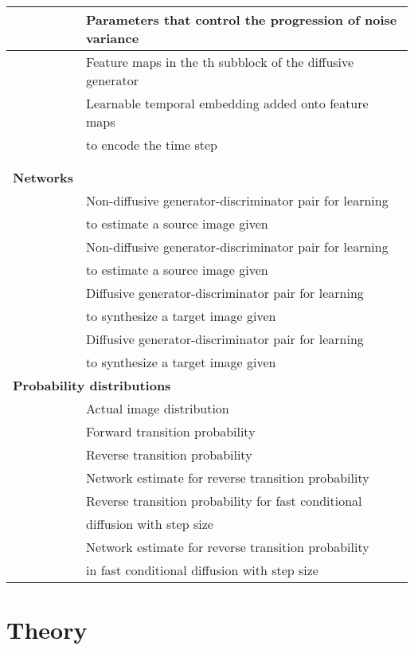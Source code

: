 \documentclass[journal,twoside,web]{ieeecolor}
\begin{document}
\begin{table}[ht!]
{\begin{tabular}{ll}
     & Parameters that control the progression of noise variance  \\
  \hline
   & Feature maps in the th subblock of the diffusive generator  \\
  \hline
     & Learnable temporal embedding added onto feature maps \\ & to encode the time step   \\
   \hline
     &   \\
  \hline
     &   \\
  \hline
    \hline
  \textbf{Networks} & {} \\ 
  \hline
     & Non-diffusive generator-discriminator pair for learning \\ & to estimate a source image  given    \\
  \hline
     & Non-diffusive generator-discriminator pair for learning \\ & to estimate a source image  given    \\
  \hline
     & Diffusive generator-discriminator pair for learning \\ & to synthesize a target image  given    \\
  \hline
     & Diffusive generator-discriminator pair for learning \\ & to synthesize a target image  given    \\
  \hline
  \hline
  \multicolumn{2}{l}{\textbf{Probability distributions}} \\
  \hline
     & Actual image distribution  \\
  \hline
     & Forward transition probability  \\
  \hline
     & Reverse transition probability  \\
  \hline
     & Network estimate for reverse
  transition probability\\
  \hline
     & Reverse transition probability for fast conditional \\ &diffusion with step size  \\
  \hline
     & Network estimate for reverse transition probability \\& in fast conditional diffusion with step size  \\
  \hline
\end{tabular}
}
\end{table}


\section{Theory}
\end{document}
